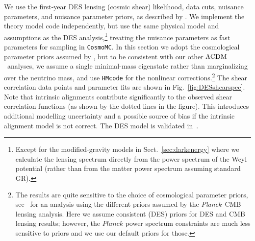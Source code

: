 \documentclass[longauth,traditabstract]{aa}
\def\Planck{\textit{Planck}}
\newcommand{\lcdm}{\texorpdfstring{{$\rm{\Lambda CDM}$}}{ΛCDM}}
\providecommand{\COSMOMC}{{\tt CosmoMC}}
\newcommand{\PlanckLensThree}{\citetalias{planck2016-l08}}
\newcommand{\planck}{\Planck}
\begin{document}
We use the first-year DES lensing (cosmic shear) likelihood, data cuts, nuisance parameters, and nuisance parameter priors, as described by \citet{Troxel:2017xyo, Abbott:2017wau,Krause:2017ekm}.
We implement the theory model code independently, but use the same physical model and assumptions as the DES analysis,\footnote{Except for the modified-gravity models in Sect.~\ref{sec:darkenergy} where we calculate the lensing spectrum directly from the power spectrum of the Weyl potential (rather than from the matter power spectrum assuming standard GR).} treating the nuisance parameters as fast parameters for sampling in \COSMOMC.
In this section we adopt the cosmological parameter priors assumed by \citet{Troxel:2017xyo}, but to be consistent with our other \lcdm\ analyses, we assume a single minimal-mass eigenstate rather than marginalizing over the neutrino mass, and use {\tt HMcode} for the nonlinear corrections.\footnote{The results are quite sensitive to the choice of cosmological parameter priors, see \PlanckLensThree\ for an analysis using the different priors assumed by the \Planck\ CMB lensing analysis. Here we assume consistent (DES) priors for DES and CMB lensing results; however, the $\planck$ power spectrum constraints are much less sensitive to priors and we use our default priors for those.} The shear correlation data points and parameter fits are shown in Fig.~\ref{fig:DESshearspec}. Note that intrinsic alignments contribute significantly to the observed
shear correlation functions (as shown by the dotted lines in the figure).
This introduces additional modelling uncertainty and a possible source of bias if the intrinsic alignment model is not correct. The DES model is validated in~\cite{Troxel:2017xyo,Krause:2017ekm}.
\end{document}
